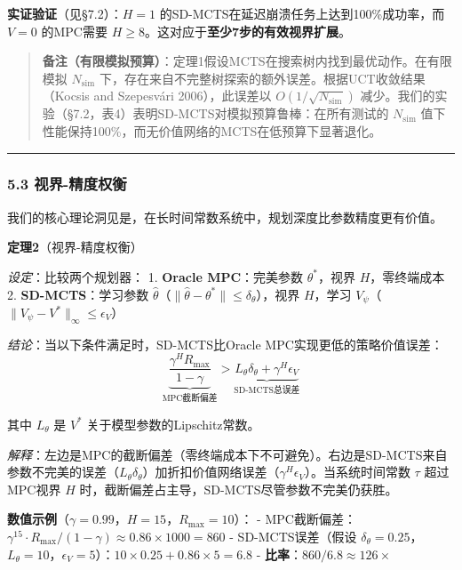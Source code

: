 \documentclass[UTF8]{ctexart}
\begin{document}
\textbf{实证验证}（见§7.2）：\(H=1\)
的SD-MCTS在延迟崩溃任务上达到100\%成功率，而 \(V=0\) 的MPC需要
\(H \geq 8\)。这对应于\textbf{至少7步的有效视界扩展}。

\begin{quote}
\textbf{备注（有限模拟预算）}：定理1假设MCTS在搜索树内找到最优动作。在有限模拟
\(N_{\text{sim}}\)
下，存在来自不完整树探索的额外误差。根据UCT收敛结果（Kocsis and
Szepesvári 2006），此误差以 \(O(1/\sqrt{N_{\text{sim}}})\)
减少。我们的实验（§7.2，表4）表明SD-MCTS对模拟预算鲁棒：在所有测试的
\(N_{\text{sim}}\)
值下性能保持100\%，而无价值网络的MCTS在低预算下显著退化。
\end{quote}

\begin{center}\rule{0.5\linewidth}{0.4pt}\end{center}

\hypertarget{ux89c6ux754c-ux7cbeux5ea6ux6743ux8861}{%
\subsubsection{5.3
视界-精度权衡}\label{ux89c6ux754c-ux7cbeux5ea6ux6743ux8861}}

我们的核心理论洞见是，在长时间常数系统中，规划深度比参数精度更有价值。

\textbf{定理2}（视界-精度权衡）

\emph{设定}：比较两个规划器： 1. \textbf{Oracle MPC}：完美参数
\(\theta^*\)，视界 \(H\)，零终端成本 2. \textbf{SD-MCTS}：学习参数
\(\hat{\theta}\)（\(\|\hat{\theta} - \theta^*\| \leq \delta_\theta\)），视界
\(H\)，学习 \(V_\psi\)（\(\|V_\psi - V^*\|_\infty \leq \epsilon_V\)）

\emph{结论}：当以下条件满足时，SD-MCTS比Oracle
MPC实现更低的策略价值误差：
\[\underbrace{\frac{\gamma^H R_{\max}}{1-\gamma}}_{\text{MPC截断偏差}} > \underbrace{L_\theta \delta_\theta + \gamma^H \epsilon_V}_{\text{SD-MCTS总误差}}\]

其中 \(L_\theta\) 是 \(V^*\) 关于模型参数的Lipschitz常数。

\emph{解释}：左边是MPC的截断偏差（零终端成本下不可避免）。右边是SD-MCTS来自参数不完美的误差（\(L_\theta \delta_\theta\)）加折扣价值网络误差（\(\gamma^H \epsilon_V\)）。当系统时间常数
\(\tau\) 超过MPC视界 \(H\)
时，截断偏差占主导，SD-MCTS尽管参数不完美仍获胜。

\textbf{数值示例}（\(\gamma = 0.99\)，\(H = 15\)，\(R_{\max} = 10\)）：
-
MPC截断偏差：\(\gamma^{15} \cdot R_{\max}/(1-\gamma) \approx 0.86 \times 1000 = 860\)
- SD-MCTS误差（假设
\(\delta_\theta = 0.25\)，\(L_\theta = 10\)，\(\epsilon_V = 5\)）：\(10 \times 0.25 + 0.86 \times 5 = 6.8\)
- \textbf{比率}：\(860 / 6.8 \approx 126\times\)
\end{document}

